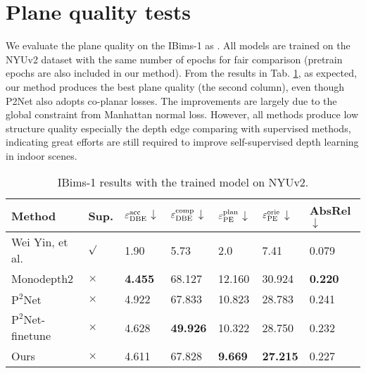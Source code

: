 \documentclass[10pt,twocolumn,letterpaper]{article}
\newcommand{\Tab}[1]{Tab. \ref{#1}}
\begin{document}
\section{Plane quality tests}
We evaluate the plane quality on the IBims-1\cite{koch2018evaluation} as \cite{yin2021learning}. All models are trained on the NYUv2 dataset with the same number of epochs for fair comparison (pretrain epochs are also included in our method). From the results in \Tab{tab:IBIMS}, as expected, our method produces the best plane quality (the second column), even though P2Net also adopts co-planar losses. The improvements are largely due to the global constraint from Manhattan normal loss. However, all methods produce low structure quality especially the depth edge comparing with supervised methods, indicating great efforts are still required to improve self-supervised depth learning in indoor scenes.
\begin{table}[h]
	\scriptsize                                                                                    
\centering
	\begin{tabularx}{0.48\textwidth}{|l|l|XX|XX|X|}
		\hline
		Method             &  Sup.    & $\varepsilon^{\rm{acc}}_{\rm{DBE}}$$\downarrow$  &  $\varepsilon^{\rm{comp}}_{\rm{DBE}}$$\downarrow$ & $\varepsilon^{\rm{plan}}_{\rm{PE}}$$\downarrow$ & $\varepsilon^{\rm{orie}}_{\rm{PE}}$$\downarrow$ & AbsRel$\downarrow$  \\ \hline
		Wei Yin, et al.\cite{yin2021learning} &   $\surd$    &  1.90         & 5.73  & 2.0  & 7.41        & 0.079 \\ \hline
		
		Monodepth2\cite{godard2019digging} & $\times$ &  \textbf{4.455} & 68.127         & 12.160           & 30.924  & \textbf{0.220}        \\ 
		$\mathrm{P}^{2}\mathrm{Net}$\cite{yu2020p}  & $\times$ &  4.922 & 67.833         & 10.823          & 28.783         & 0.241 \\
		$\mathrm{P}^{2}\mathrm{Net}$-finetune  & $\times$ &  4.628 & \textbf{49.926}         & 10.322           & 28.750         & 0.232 \\
		Ours        & $\times$  &  4.611         & 67.828  & \textbf{9.669}  & \textbf{27.215}        & 0.227 \\ \hline
	\end{tabularx}
	\newline
	\caption{IBims-1 results with the trained model on NYUv2.}
	\label{tab:IBIMS}
\end{table}
\end{document}

